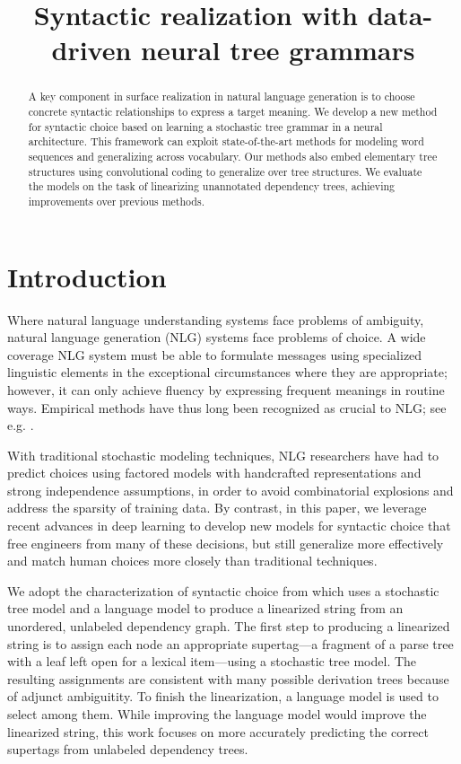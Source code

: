 \documentclass[11pt]{article}
\title{Syntactic realization with data-driven neural tree grammars}
\date{}
\begin{document}
\maketitle
\begin{abstract}

A key component in surface realization in natural language generation
is to choose concrete syntactic relationships to express a target
meaning.
%
We develop a new method for syntactic choice based on learning a
stochastic tree grammar in a neural architecture.
%
This framework can exploit state-of-the-art methods for modeling word
sequences and generalizing across vocabulary.
%
Our methods also embed elementary tree structures using convolutional
coding to generalize over tree structures.
%
We evaluate the models on the task of linearizing unannotated
dependency trees, achieving improvements over previous methods.

\end{abstract}

\section{Introduction}

Where natural language understanding systems face problems of
ambiguity, natural language generation (NLG) systems face problems of
choice. A wide coverage NLG system must be able to formulate messages
using specialized linguistic elements in the exceptional circumstances
where they are appropriate; however, it can only achieve fluency by
expressing frequent meanings in routine ways. Empirical methods have
thus long been recognized as crucial to NLG; see
e.g. .

With traditional stochastic modeling techniques, NLG researchers have
had to predict choices using factored models with handcrafted
representations and strong independence assumptions, in order to avoid
combinatorial explosions and address the sparsity of training data.
By contrast, in this paper, we leverage recent advances in deep
learning to develop new models for syntactic choice that free
engineers from many of these decisions, but still generalize more
effectively and match human choices more closely than traditional
techniques.

We adopt the characterization of syntactic choice from
 which uses a stochastic tree model and a language model to produce a linearized string from an unordered,
unlabeled dependency graph.
%
The first step to producing a linearized string is
to assign each node an appropriate supertag---a fragment of a parse tree with
a leaf left open for a lexical item---using a stochastic tree model.
The resulting assignments are consistent with many possible derivation trees
because of adjunct ambiguitity.
%
To finish the linearization, a language model is used to select among them.
%
While improving the language model would improve the linearized string,
this work focuses on more accurately predicting the correct supertags from
unlabeled dependency trees.
\end{document}
